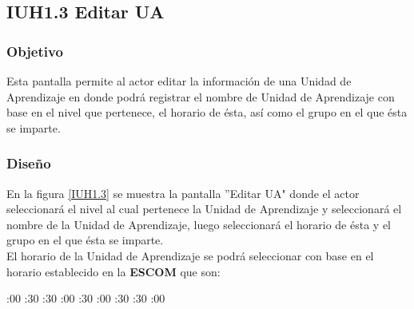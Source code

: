 \subsection{IUH1.3 Editar UA}

\subsubsection{Objetivo}

Esta pantalla permite al actor editar la información de una Unidad de Aprendizaje en donde podrá registrar el nombre de Unidad de Aprendizaje con base en el nivel que pertenece, el horario de ésta, así como el grupo en el que ésta se imparte.

\subsubsection{Diseño}

En la figura \ref{IUH1.3} se muestra la pantalla ''Editar UA" donde el actor seleccionará el nivel al cual pertenece la Unidad de Aprendizaje y seleccionará el nombre de la Unidad de Aprendizaje, luego seleccionará el horario de ésta y el grupo en el que ésta se imparte.\\

El horario de la Unidad de Aprendizaje se podrá seleccionar con base en el horario establecido en la \textbf{ESCOM} que son: \\

\begin{UClist}

	:00
	:30
	:30
	:00
	:30
	:00
	:30
	:30
	:00

\end{UClist}

